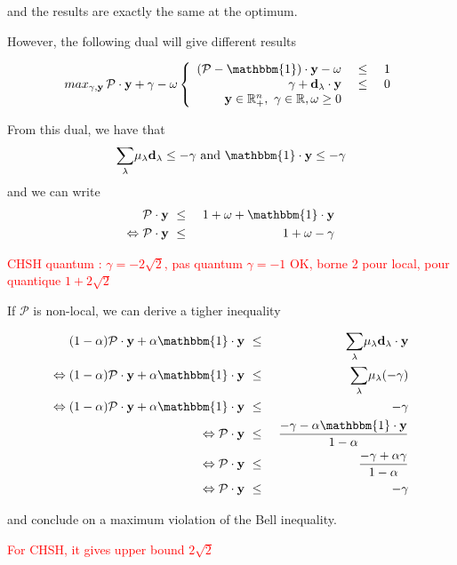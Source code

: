 and the results are exactly the same at the optimum.
\vspace{2cm}

However, the following dual will give different results 

\begin{equation}
    \displaystyle{ max_{\gamma,\mathbf{y}} \,  \mathcal{P}\cdot \mathbf{y} + \gamma  -\omega } \\

\left\{
\begin{array}{rcl}
 (\mathcal{P} - \mathbbm{1}) \cdot \mathbf{y} -\omega &\ \leq \ & 1\\
 \gamma  + \mathbf{d_\lambda} \cdot \mathbf{y} &\ \leq \ & 0\\

\mathbf{y} \in \mathbb{R}_+^n ,\ \gamma \in \mathbb{R}, \omega \geq 0  & &
\end{array}
\right.
\label{eq:dual}

\end{equation}


From this dual, we have that 
\begin{equation}
    \displaystyle{\sum_\lambda} \mu_\lambda \mathbf{d_\lambda} \leq -\gamma  \text{ and } \mathbbm{1}\cdot\mathbf{y} \leq - \gamma
\end{equation}
and we can write  
\begin{eqnarray*}
\mathcal{P}\cdot \mathbf{y}&\ \leq \ & 1 + \omega + \mathbbm{1}\cdot\mathbf{y} \\
\Leftrightarrow \mathcal{P}\cdot \mathbf{y}&\ \leq \ & 1 + \omega - \gamma
\end{eqnarray*}

\textcolor{red}{CHSH quantum : $\gamma = - 2\sqrt{2}$, pas quantum $\gamma = -1$ OK, borne 2 pour local, pour quantique $1 + 2\sqrt{2}$ }


If $\mathcal{P}$ is non-local, we can derive a tigher inequality 

\begin{eqnarray*}
  \text{ } (1-\alpha) \mathcal{P}\cdot \mathbf{y}+ \alpha \mathbbm{1} \cdot \mathbf{y}&\ \leq \ & \displaystyle{\sum_\lambda} \mu_\lambda \mathbf{d_\lambda}\cdot \mathbf{y} \\
 \Leftrightarrow (1-\alpha) \mathcal{P}\cdot \mathbf{y}+ \alpha \mathbbm{1} \cdot \mathbf{y}&\ \leq \ &  \displaystyle{\sum_\lambda} \mu_\lambda (- \gamma) \\
 \Leftrightarrow (1-\alpha) \mathcal{P}\cdot \mathbf{y}+ \alpha \mathbbm{1}\cdot \mathbf{y} &\ \leq \ &   - \gamma \\
 \Leftrightarrow  \mathcal{P}\cdot \mathbf{y}   &\ \leq \ & \dfrac{- \gamma - \alpha \mathbbm{1} \cdot\mathbf{y}}{1-\alpha} \\
 \Leftrightarrow   \mathcal{P}\cdot \mathbf{y}   &\ \leq \ &   \dfrac{- \gamma + \alpha \gamma}{1-\alpha} \\
 \Leftrightarrow   \mathcal{P}\cdot \mathbf{y}   &\ \leq \ &   -\gamma \\
\end{eqnarray*}

and conclude on a maximum violation of the Bell inequality. 

\textcolor{red}{For CHSH, it gives upper bound $2\sqrt{2}$ }
\textcolor{red}{}










